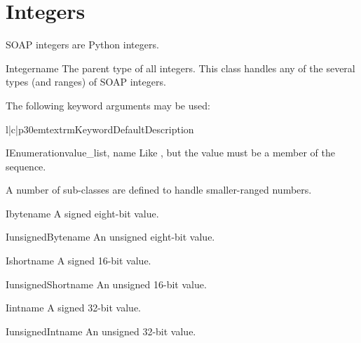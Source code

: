 \section{Integers}

SOAP integers are Python integers.

\begin{classdesc}{Integer}{name}
The parent type of all integers.
This class handles any of the several types (and ranges) of SOAP integers.

The following keyword arguments may be used:

\begin{tableiii}{l|c|p{30em}}{textrm}{Keyword}{Default}{Description}
\end{tableiii}
\end{classdesc}

\begin{classdesc}{IEnumeration}{value_list, name}
Like , but the value must be a member of
the  sequence.
\end{classdesc}

A number of sub-classes are defined to handle smaller-ranged numbers.

\begin{classdesc}{Ibyte}{name}
A signed eight-bit value.
\end{classdesc}

\begin{classdesc}{IunsignedByte}{name}
An unsigned eight-bit value.
\end{classdesc}

\begin{classdesc}{Ishort}{name}
A signed 16-bit value.
\end{classdesc}

\begin{classdesc}{IunsignedShort}{name}
An unsigned 16-bit value.
\end{classdesc}

\begin{classdesc}{Iint}{name}
A signed 32-bit value.
\end{classdesc}

\begin{classdesc}{IunsignedInt}{name}
An unsigned 32-bit value.
\end{classdesc}

